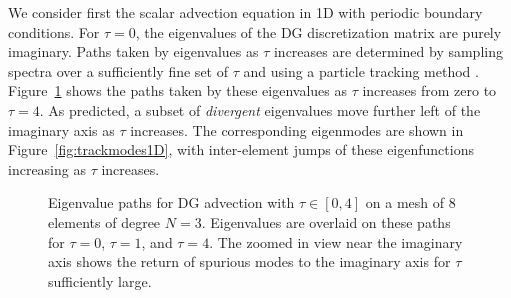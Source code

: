 \documentclass[10pt]{article}
\begin{document}
We consider first the scalar advection equation in 1D with periodic boundary conditions.  For $\tau = 0$, the eigenvalues of the DG discretization matrix are purely imaginary.  Paths taken by eigenvalues as $\tau$ increases are determined by sampling spectra over a sufficiently fine set of $\tau$ and using a particle tracking method \cite{simpletracker}.  Figure~\ref{fig:track1D} shows the paths taken by these eigenvalues as $\tau$ increases from zero to $\tau = 4$.  As predicted, a subset of \emph{divergent} eigenvalues move further left of the imaginary axis as $\tau$ increases.  The corresponding eigenmodes are shown in Figure~\ref{fig:trackmodes1D}, with inter-element jumps of these eigenfunctions increasing as $\tau$ increases.  

\begin{figure}
\centering
{}
\hspace{1em}
\caption{Eigenvalue paths for DG advection with $\tau \in [0,4]$ on a mesh of 8 elements of degree $N=3$.  Eigenvalues are overlaid on these paths for $\tau = 0$, $\tau = 1$, and $\tau = 4$.  The zoomed in view near the imaginary axis shows the return of spurious modes to the imaginary axis for $\tau$ sufficiently large. }
\label{fig:track1D}
\end{figure}
\end{document}
